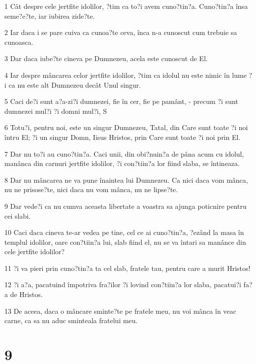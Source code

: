 \par 1 Cât despre cele jertfite idolilor, ?tim ca to?i avem cuno?tin?a. Cuno?tin?a însa seme?e?te, iar iubirea zide?te.
\par 2 Iar daca i se pare cuiva ca cunoa?te ceva, înca n-a cunoscut cum trebuie sa cunoasca.
\par 3 Dar daca iube?te cineva pe Dumnezeu, acela este cunoscut de El.
\par 4 Iar despre mâncarea celor jertfite idolilor, ?tim ca idolul nu este nimic în lume ?i ca nu este alt Dumnezeu decât Unul singur.
\par 5 Caci de?i sunt a?a-zi?i dumnezei, fie în cer, fie pe pamânt, - precum ?i sunt dumnezei mul?i ?i domni mul?i, S
\par 6 Totu?i, pentru noi, este un singur Dumnezeu, Tatal, din Care sunt toate ?i noi întru El; ?i un singur Domn, Iisus Hristos, prin Care sunt toate ?i noi prin El.
\par 7 Dar nu to?i au cuno?tin?a. Caci unii, din obi?nuin?a de pâna acum cu idolul, manânca din carnuri jertfite idolilor, ?i con?tiin?a lor fiind slaba, se întineaza.
\par 8 Dar nu mâncarea ne va pune înaintea lui Dumnezeu. Ca nici daca vom mânca, nu ne prisose?te, nici daca nu vom mânca, nu ne lipse?te.
\par 9 Dar vede?i ca nu cumva aceasta libertate a voastra sa ajunga poticnire pentru cei slabi.
\par 10 Caci daca cineva te-ar vedea pe tine, cel ce ai cuno?tin?a, ?ezând la masa în templul idolilor, oare con?tiin?a lui, slab fiind el, nu se va întari sa manânce din cele jertfite idolilor?
\par 11 ?i va pieri prin cuno?tin?a ta cel slab, fratele tau, pentru care a murit Hristos!
\par 12 ?i a?a, pacatuind împotriva fra?ilor ?i lovind con?tiin?a lor slaba, pacatui?i fa?a de Hristos.
\par 13 De aceea, daca o mâncare sminte?te pe fratele meu, nu voi mânca în veac carne, ca sa nu aduc sminteala fratelui meu.

\chapter{9}

